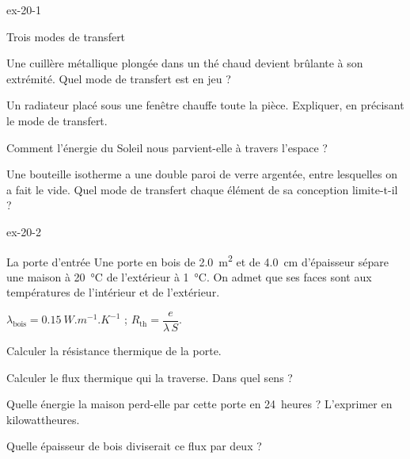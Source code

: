 \begin{blocLivre}{ex-20-1}
\begin{exercice}[1]{Trois modes de transfert}
\begin{questions}
\item Une cuillère métallique plongée dans un thé chaud devient brûlante à son extrémité. Quel mode de transfert est en
jeu ?
\item Un radiateur placé sous une fenêtre chauffe toute la pièce. Expliquer, en précisant le mode de transfert.
\item Comment l'énergie du Soleil nous parvient-elle à travers l'espace ?
\item Une bouteille isotherme a une double paroi de verre argentée, entre lesquelles on a fait le vide. Quel mode de
transfert chaque élément de sa conception limite-t-il ?
\end{questions}
\end{exercice}
\end{blocLivre}
\begin{blocLivre}{ex-20-2}
\begin{exercice}[1]{La porte d'entrée}
Une porte en bois de \qty{2,0}{m^2} et de \qty{4,0}{cm} d'épaisseur sépare une maison à \qty{20}{\degreeCelsius} de l'extérieur à
\qty{1}{\degreeCelsius}. On admet que ses faces sont aux températures de l'intérieur et de l'extérieur.
\begin{donnees}
$\lambda_\mathrm{bois}=\qty{0,15}{W.m^{-1}.K^{-1}}$ ; $R_\mathrm{th}=\dfrac{e}{\lambda\,S}$.
\end{donnees}
\begin{questions}
\item Calculer la résistance thermique de la porte.
\item Calculer le flux thermique qui la traverse. Dans quel sens ?
\item Quelle énergie la maison perd-elle par cette porte en 24~heures ? L'exprimer en kilowattheures.
\item Quelle épaisseur de bois diviserait ce flux par deux ?
\end{questions}
\end{exercice}
\end{blocLivre}
